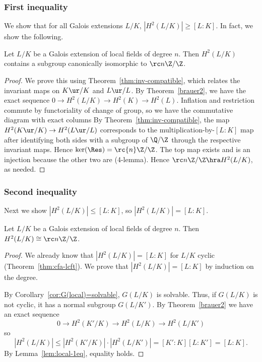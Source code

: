 \subsubsection{First inequality}
We show that for all Galois extensions $L/K$, $|H^2(L/K)|\ge [L:K]$. In fact, we show the following.
\begin{lem}
Let $L/K$ be a Galois extension of local fields of degree $n$. Then $H^2(L/K)$ contains a subgroup canonically isomorphic to $\rc n\Z/\Z$.
\end{lem}
\begin{proof}
We prove this using Theorem~\ref{thm:inv-compatible}, which relates the invariant maps on $K\ur/K$ and $L\ur/L$. By Theorem~\ref{brauer2}, we have the exact sequence $0\to H^2(L/K)\to H^2(K)\to H^2(L)$. 
Inflation and restriction commute by functoriality of change of group, so we have the commutative diagram with exact columns
\eeq
By Theorem~\ref{thm:inv-compatible}, the map $H^2(K\ur/K)\to H^2(L\ur/L)$ corresponds to the multiplication-by-$[L:K]$ map after identifying both sides with a subgroup of $\Q/\Z$ through the respective invariant maps. Hence $\ker(\Res)=\rc{n}\Z/\Z$. The top map exists and is an injection because the other two are (4-lemma). Hence $\rc n\Z/\Z\hra H^2(L/K)$, as needed.
\end{proof}
\subsubsection{Second inequality}
Next we show $|H^2(L/K)|\le [L:K]$, so $|H^2(L/K)|=[L:K]$.
\begin{lem}
Let $L/K$ be a Galois extension of local fields of degree $n$. Then $H^2(L/K)\cong\rc n\Z/\Z$.
\end{lem}
\begin{proof}
We already know that $|H^2(L/K)|=[L:K]$ for $L/K$ cyclic (Theorem~\ref{thm:cfa-lcft}). We prove that $|H^2(L/K)|=[L:K]$ by induction on the degree.

By Corollary~\ref{cor:G(local)=solvable}, $G(L/K)$ is solvable. Thus, if $G(L/K)$ is not cyclic, it has a normal subgroup $G(L/K')$. By Theorem~\ref{brauer2} we have an exact sequence
\[
0\to H^2(K'/K)\to H^2(L/K)\to H^2(L/K')
\]
so
\[
|H^2(L/K)|\le |H^2(K'/K)|\cdot |H^2(L/K')|=[K':K][L:K']=[L:K].
\]
By Lemma~\ref{lem:local-1eq}, equality holds.
\end{proof}
